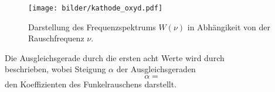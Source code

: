 	\begin{figure}
		\centering
		\texttt{[image: bilder/kathode\_oxyd.pdf]}
		\caption{Darstellung des Frequenzspektrums $W(\nu)$ in 
		Abhängikeit von der Rauschfrequenz $\nu$.}
		\label{fig:kathode_oxyd}
	\end{figure}
	
	Die Ausgleichsgerade durch die ersten acht Werte wird durch 
	\begin{equation}
	
	\end{equation}
	beschrieben, wobei Steigung $\alpha$ der Ausgleichsgeraden 
	\begin{equation}
	\alpha = 
	\end{equation}
	den Koeffizienten des Funkelrauschens darstellt.